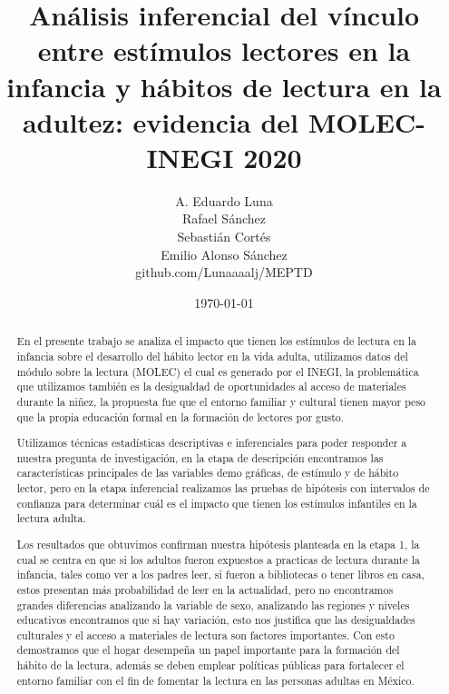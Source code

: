 \documentclass[aps,reprint]{revtex4-2}
\begin{document}
\title{Análisis inferencial del vínculo entre estímulos lectores en la infancia y hábitos de lectura en la adultez: evidencia del MOLEC-INEGI 2020}
\author{A. Eduardo Luna\\Rafael Sánchez\\Sebastián Cortés\\ Emilio Alonso Sánchez\\github.com/Lunaaaalj/MEPTD}
\date{\today}

\begin{abstract}
    En el presente trabajo se analiza el impacto que tienen los estímulos de lectura en la infancia sobre el desarrollo del hábito lector en la vida adulta, utilizamos datos del módulo sobre la lectura (MOLEC) el cual es generado por el INEGI, la problemática que utilizamos también es la desigualdad de oportunidades al acceso de materiales durante la niñez, la propuesta fue que el entorno familiar y cultural tienen mayor peso que la propia educación formal en la formación de lectores por gusto.

	Utilizamos técnicas estadísticas descriptivas e inferenciales para poder responder a nuestra pregunta de investigación, en la etapa de descripción encontramos las características principales de las variables demo gráficas, de estímulo y de hábito lector, pero en la etapa inferencial realizamos las pruebas de hipótesis con intervalos de confianza para determinar cuál es el impacto que tienen los estímulos infantiles en la lectura adulta. 
	
	Los resultados que obtuvimos confirman nuestra hipótesis planteada en la etapa 1, la cual se centra en que si los adultos fueron expuestos a practicas de lectura durante la infancia, tales como ver a los padres leer, si fueron a bibliotecas o tener libros en casa, estos presentan más probabilidad de leer en la actualidad, pero no encontramos grandes diferencias analizando  la variable de sexo, analizando las regiones y niveles educativos encontramos que si hay variación, esto nos justifica que las desigualdades culturales y el acceso a materiales de lectura son factores importantes.
	Con esto demostramos que el hogar desempeña un papel importante para la formación del hábito de la lectura, además se deben emplear políticas públicas para fortalecer el entorno familiar con el fin de fomentar la lectura en las personas adultas en México.
\end{abstract}


\maketitle
\end{document}
